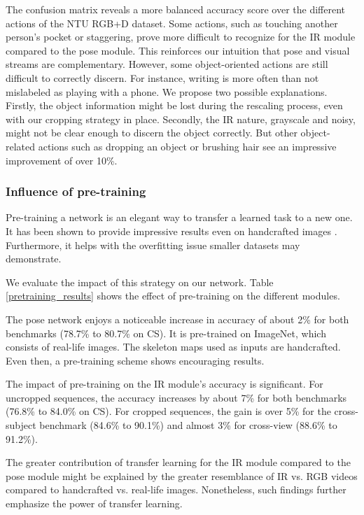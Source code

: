 \documentclass[letterpaper, 10 pt, conference]{ieeeconf}
\begin{document}
The confusion matrix reveals a more balanced accuracy score over the different actions of the NTU RGB+D dataset. Some actions, such as touching another person's pocket or staggering, prove more difficult to recognize for the IR module compared to the pose module. This reinforces our intuition that pose and visual streams are complementary. However, some object-oriented actions are still difficult to correctly discern. For instance, writing is more often than not mislabeled as playing with a phone. We propose two possible explanations. Firstly, the object information might be lost during the rescaling process, even with our cropping strategy in place. Secondly, the IR nature, grayscale and noisy, might not be clear enough to discern the object correctly. But other object-related actions such as dropping an object or brushing hair see an impressive improvement of over 10\%. 

\subsubsection{Influence of pre-training}

Pre-training a network is an elegant way to transfer a learned task to a new one. It has been shown to provide impressive results even on handcrafted images \cite{zhang2019view}. Furthermore, it helps with the overfitting issue smaller datasets may demonstrate.

We evaluate the impact of this strategy on our network. Table \ref{pretraining_results} shows the effect of pre-training on the different modules. 

The pose network enjoys a noticeable increase in accuracy of about 2\% for both benchmarks (78.7\% to 80.7\% on CS). It is pre-trained on ImageNet, which consists of real-life images. The skeleton maps used as inputs are handcrafted. Even then, a pre-training scheme shows encouraging results.

The impact of pre-training on the IR module's accuracy is significant. For uncropped sequences, the accuracy increases by about 7\% for both benchmarks (76.8\% to 84.0\% on CS). For cropped sequences, the gain is over 5\% for the cross-subject benchmark (84.6\% to 90.1\%) and almost 3\% for cross-view (88.6\% to 91.2\%). 

The greater contribution of transfer learning for the IR module compared to the pose module might be explained by the greater resemblance of IR vs. RGB videos compared to handcrafted vs. real-life images. Nonetheless, such findings further emphasize the power of transfer learning. 
\end{document}
